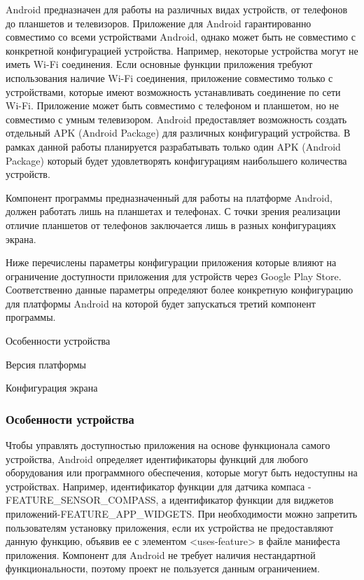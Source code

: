 Android предназначен для работы на различных видах устройств, от телефонов до планшетов и телевизоров. 
Приложение для Android гарантированно совместимо со всеми устройствами Android, однако может быть не совместимо с конкретной конфигурацией устройства. Например, некоторые устройства могут не иметь  Wi-Fi соединения. Если основные функции приложения требуют использования наличие Wi-Fi соединения, приложение совместимо только с устройствами, которые имеют возможность устанавливать соединение по сети Wi-Fi. Приложение может быть совместимо с телефоном и планшетом, но не совместимо с умным телевизором.
Android предоставляет возможность создать отдельный APK (Android Package) для различных конфигураций устройства. В рамках данной работы планируется разрабатывать только один APK (Android Package) который будет удовлетворять конфигурациям наибольшего количества устройств. 

Компонент программы предназначенный для работы на платформе Android, должен работать лишь на планшетах и телефонах. С точки зрения реализации отличие планшетов от телефонов заключается лишь в разных конфигурациях экрана.

Ниже перечислены параметры конфигурации приложения которые влияют на ограничение доступности приложения для устройств через Google Play Store.  
Соответственно данные параметры определяют более конкретную конфигурацию для платформы Android на которой будет запускаться третий компонент программы.

\begin{my_enumerate}
\item Особенности устройства
\item Версия платформы
\item Конфигурация экрана
\end{my_enumerate}

\subsubsection{Особенности устройства}
Чтобы управлять доступностью приложения на основе функционала самого устройства, Android определяет идентификаторы функций для любого оборудования или программного обеспечения, которые могут быть недоступны на устройствах. Например, идентификатор функции для датчика компаса - FEATURE\_SENSOR\_COMPASS, а идентификатор функции для виджетов приложений-FEATURE\_APP\_WIDGETS.
При необходимости можно запретить пользователям установку приложения, если их устройства не предоставляют данную функцию, объявив ее с элементом <uses-feature> в файле манифеста приложения.
Компонент для Android не требует наличия нестандартной функциональности, поэтому проект не пользуется данным ограничением.

